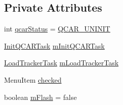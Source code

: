 \subsection*{\-Private \-Attributes}
\begin{DoxyCompactItemize}
\item 
int \hyperlink{classsrdes_1_1menupp_1_1_qcar_engine_a13e553c7e5c2c2548202b3b411d3a074}{qcar\-Status} = \hyperlink{classsrdes_1_1menupp_1_1_qcar_engine_acb32f3276ef00bb9e81c501a99439a6a}{\-Q\-C\-A\-R\-\_\-\-U\-N\-I\-N\-I\-T}
\item 
\hyperlink{classsrdes_1_1menupp_1_1_qcar_engine_1_1_init_q_c_a_r_task}{\-Init\-Q\-C\-A\-R\-Task} \hyperlink{classsrdes_1_1menupp_1_1_qcar_engine_accfd913c2eb01f7c4b73b304445fbe02}{m\-Init\-Q\-C\-A\-R\-Task}
\item 
\hyperlink{classsrdes_1_1menupp_1_1_qcar_engine_1_1_load_tracker_task}{\-Load\-Tracker\-Task} \hyperlink{classsrdes_1_1menupp_1_1_qcar_engine_a47b37e04a01a6ba78ddf2e194d43ea83}{m\-Load\-Tracker\-Task}
\item 
\-Menu\-Item \hyperlink{classsrdes_1_1menupp_1_1_qcar_engine_a66cc2469487ed47f4cbb5b0ed0b86e3d}{checked}
\item 
boolean \hyperlink{classsrdes_1_1menupp_1_1_qcar_engine_a48c4692130b49473b01d301dea848a1e}{m\-Flash} = false
\end{DoxyCompactItemize}
